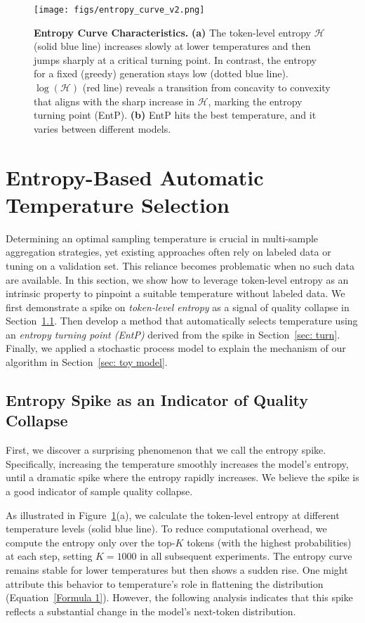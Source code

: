 \begin{figure}[ht]
\centering
\texttt{[image: figs/entropy\_curve\_v2.png]}
\vspace{-6mm}
\caption{\textbf{Entropy Curve Characteristics.} 
\textbf{(a)} The token-level entropy \(\mathcal{H}\) (solid blue line) increases slowly at lower temperatures and then jumps sharply at a critical turning point. In contrast, the entropy for a fixed (greedy) generation stays low (dotted blue line). \(\log(\mathcal{H})\) (red line) reveals a transition from concavity to convexity that aligns with the sharp increase in \(\mathcal{H}\), marking the entropy turning point (EntP). \textbf{(b)} EntP hits the best temperature, and it varies between different models.}
\label{fig: entropy_curve}
\vspace{-5mm}
\end{figure}
\section{Entropy-Based Automatic Temperature Selection}
\label{sec: 4}
Determining an optimal sampling temperature is crucial in multi-sample aggregation strategies, yet existing approaches often rely on labeled data or tuning on a validation set. This reliance becomes problematic when no such data are available. 
In this section, we show how to leverage token-level entropy as an intrinsic property to pinpoint a suitable temperature without labeled data. We first demonstrate a spike on \emph{token-level entropy} as a signal of quality collapse in Section~\ref{sec: spike}. Then develop a method that automatically selects temperature using an \emph{entropy turning point (EntP)} derived from the spike in Section~\ref{sec: turn}. Finally, we applied a stochastic process model to explain the mechanism of our algorithm in Section~\ref{sec: toy model}.
\subsection{Entropy Spike as an Indicator of Quality Collapse}
\label{sec: spike}
First, we discover a surprising phenomenon that we call the entropy spike. Specifically, increasing the temperature smoothly increases the model’s entropy, until a dramatic spike where the entropy rapidly increases. We believe the spike is a good indicator of sample quality collapse.

As illustrated in Figure~\ref{fig: entropy_curve}(a), we calculate the token-level entropy at different temperature levels (solid blue line). To reduce computational overhead, we compute the entropy only over the top-$K$ tokens (with the highest probabilities) at each step, setting $K=1000$ in all subsequent experiments. The entropy curve remains stable for lower temperatures but then shows a sudden rise. One might attribute this behavior to temperature’s role in flattening the distribution (Equation~\ref{Formula 1}). However, the following analysis indicates that this spike reflects a substantial change in the model’s next-token distribution.

